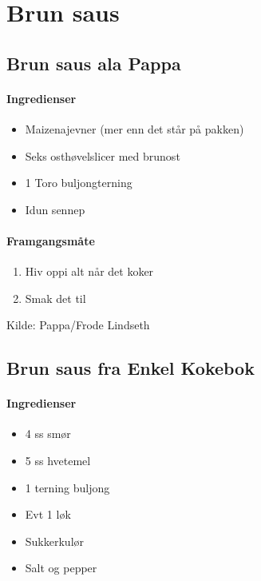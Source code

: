 \section{Brun saus}


\subsection{Brun saus ala Pappa}

\paragraph{Ingredienser}
\begin{itemize}[noitemsep]
	\item Maizenajevner (mer enn det står på pakken)
	\item Seks osthøvelslicer med brunost
	\item 1 Toro buljongterning
	\item Idun sennep
\end{itemize}


\paragraph{Framgangsmåte}
\begin{enumerate}[noitemsep]
	\item Hiv oppi alt når det koker
	\item Smak det til
\end{enumerate}

Kilde: Pappa/Frode Lindseth


\subsection{Brun saus fra Enkel Kokebok}
\paragraph{Ingredienser}
\begin{itemize}[noitemsep]
	\item 4 ss smør
	\item 5 ss hvetemel
	\item 1 terning buljong
	\item Evt 1 løk
	\item Sukkerkulør
	\item Salt og pepper
\end{itemize}


